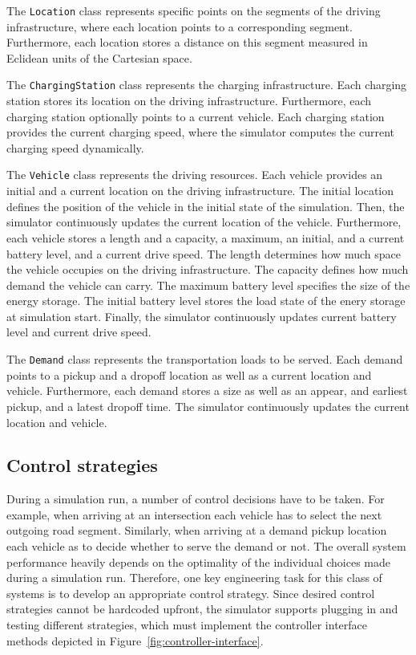 \documentclass[a4paper,twoside]{article}
\begin{document}
	The \texttt{Location} class represents specific points on the segments of the driving infrastructure, where
	each location points to a corresponding segment.
	Furthermore, each location stores a distance on this segment measured in Eclidean units of the Cartesian space.
	
	The \texttt{ChargingStation} class represents the charging infrastructure.
	Each charging station stores its location on the driving infrastructure.
	Furthermore, each charging station optionally points to a current vehicle.
	Each charging station provides the current charging speed, where the simulator computes the current charging speed dynamically.
	
	The \texttt{Vehicle} class represents the driving resources.
	Each vehicle provides an initial and a current location on the driving infrastructure.
	The initial location defines the position of the vehicle in the initial state of the simulation.
	Then, the simulator continuously updates the current location of the vehicle.
	Furthermore, each vehicle stores a length and a capacity, a maximum, an initial, and a current battery level, and a current drive speed.
	The length determines how much space the vehicle occupies on the driving infrastructure.
	The capacity defines how much demand the vehicle can carry.
	The maximum battery level specifies the size of the energy storage.
	The initial battery level stores the load state of the enery storage at simulation start.
	Finally, the simulator continuously updates current battery level and current drive speed.
	
	The \texttt{Demand} class represents the transportation loads to be served.
	Each demand points to a pickup and a dropoff location as well as a current location and vehicle.
	Furthermore, each demand stores a size as well as an appear, and earliest pickup, and a latest dropoff time.
	The simulator continuously updates the current location and vehicle.
	
	\subsection{Control strategies}
	\label{sec:controller-interface}
	
	During a simulation run, a number of control decisions have to be taken.
	For example, when arriving at an intersection each vehicle has to select the next outgoing road segment.
	Similarly, when arriving at a demand pickup location each vehicle as to decide whether to serve the demand or not.
	The overall system performance heavily depends on the optimality of the individual choices made during a simulation run.
	Therefore, one key engineering task for this class of systems is to develop an appropriate control strategy.
	Since desired control strategies cannot be hardcoded upfront, the simulator supports plugging in and testing different strategies, which must implement the controller interface methods depicted in Figure~\ref{fig:controller-interface}.
	
\end{document}
